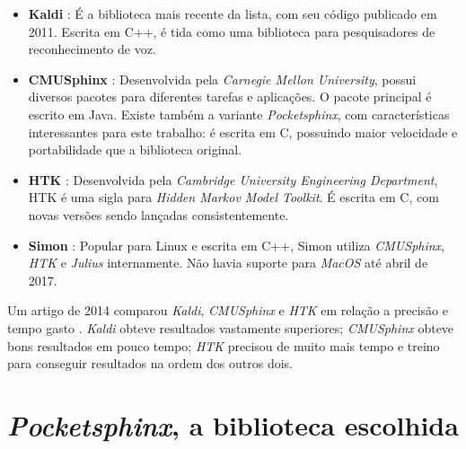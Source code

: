 \begin{itemize}
\item \textbf{Kaldi} \citep{kaldi}: É a biblioteca mais recente da lista, com seu código publicado em 2011. Escrita em C++, é tida como uma biblioteca para pesquisadores de reconhecimento de voz.

\item \textbf{CMUSphinx} \citep{cmusphinx}: Desenvolvida pela \textit{Carnegie Mellon University}, possui diversos pacotes para diferentes tarefas e aplicações. O pacote principal é escrito em Java. Existe também a variante \emph{Pocketsphinx}, com características interessantes para este trabalho: é escrita em C, possuindo maior velocidade e portabilidade que a biblioteca original.

\item \textbf{HTK} \citep{htk}: Desenvolvida pela \textit{Cambridge University Engineering Department}, HTK é uma sigla para \textit{Hidden Markov Model Toolkit}. É escrita em C, com novas versões sendo lançadas consistentemente.

\item \textbf{Simon} \citep{Simon}: Popular para Linux e escrita em C++, Simon utiliza \textit{CMUSphinx}, \textit{HTK} e \textit{Julius} internamente. Não havia suporte para \textit{MacOS} até abril de 2017.
\end{itemize}

Um artigo de 2014 comparou \emph{Kaldi}, \emph{CMUSphinx} e \emph{HTK} em relação a precisão e tempo gasto \citep{compareSpeech}. \emph{Kaldi} obteve resultados vastamente superiores; \emph{CMUSphinx} obteve bons resultados em pouco tempo; \emph{HTK} precisou de muito mais tempo e treino para conseguir resultados na ordem dos outros dois.


\section{\textit{Pocketsphinx}, a biblioteca escolhida}

